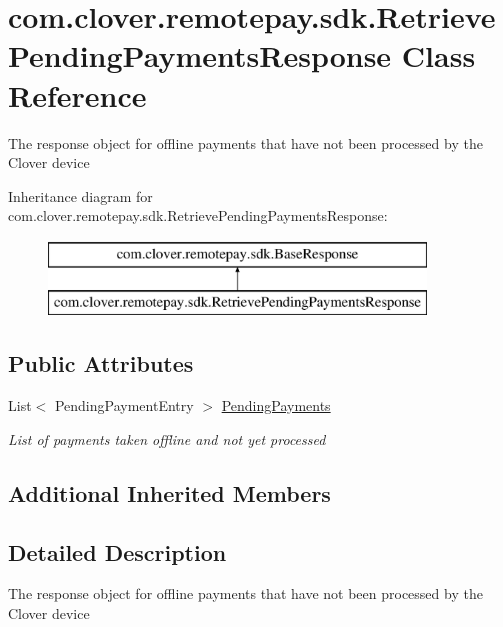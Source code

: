 \hypertarget{classcom_1_1clover_1_1remotepay_1_1sdk_1_1_retrieve_pending_payments_response}{}\section{com.\+clover.\+remotepay.\+sdk.\+Retrieve\+Pending\+Payments\+Response Class Reference}
\label{classcom_1_1clover_1_1remotepay_1_1sdk_1_1_retrieve_pending_payments_response}


The response object for offline payments that have not been processed by the Clover device  


Inheritance diagram for com.\+clover.\+remotepay.\+sdk.\+Retrieve\+Pending\+Payments\+Response\+:\begin{figure}[H]
\begin{center}
\leavevmode
\includegraphics[height=2.000000cm]{classcom_1_1clover_1_1remotepay_1_1sdk_1_1_retrieve_pending_payments_response}
\end{center}
\end{figure}
\subsection*{Public Attributes}
\begin{DoxyCompactItemize}
\item 
List$<$ Pending\+Payment\+Entry $>$ \hyperlink{classcom_1_1clover_1_1remotepay_1_1sdk_1_1_retrieve_pending_payments_response_a71ad54fea229a5d583419a8d3db126f3}{Pending\+Payments}
\begin{DoxyCompactList}\small\item\em List of payments taken offline and not yet processed \end{DoxyCompactList}\end{DoxyCompactItemize}
\subsection*{Additional Inherited Members}


\subsection{Detailed Description}
The response object for offline payments that have not been processed by the Clover device 



